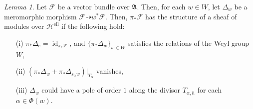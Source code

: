 \documentclass[a4paper]{report}
\theoremstyle{theorem}
\theoremstyle{definition}
\theoremstyle{remark}
\theoremstyle{proposition}
\theoremstyle{conjecture}
\theoremstyle{lemma}
\newtheorem{lemma}{Lemma}
\theoremstyle{corollary}
\theoremstyle{exercise}
\theoremstyle{example}
\newcommand{\mcal}{\mathcal}
\newcommand{\on}{\operatorname}
\newcommand{\coh}{\on{\mathbf{Coh}}}
\newcommand{\lmod}{\on{\mathbf{-Mod}}}
\newcommand{\qTor}{\on{\mathbf{qTor}}}
\begin{document}
  
  \begin{lemma}\label{lem_module_over_ellaha}
      Let $\mcal{F}$ be a vector bundle over $\mathfrak{A}$. Then, for each 
      $w\in W$, let $\Delta_w$ be a meromorphic morphism 
      $\mcal{F} \dashrightarrow w^\ast \mcal{F}$. Then, $\pi_\ast \mcal{F}$ has the 
      structure of a sheaf of modules over $\mcal{H}^{\on{ell}}$
      if the following hold:
      \begin{itemize}
          \item[(i)] $\pi_\ast\Delta_e = \on{id}_{\pi_\ast\mcal{F}}$, and $\lbrace \pi_\ast\Delta_w\rbrace_{w \in W}$ satisfies the relations of the Weyl group $W$,
          \item[(ii)] $(\pi_\ast\Delta_w + \pi_\ast\Delta_{s_\alpha w})\vert_{T_\alpha}$ vanishes,
          \item[(iii)] $\Delta_w$ could have a pole of order $1$ along 
              the divisor $T_{\alpha,\hbar}$ for each $\alpha \in \Phi(w)$.
      \end{itemize}
  \end{lemma}
  
\end{document}
